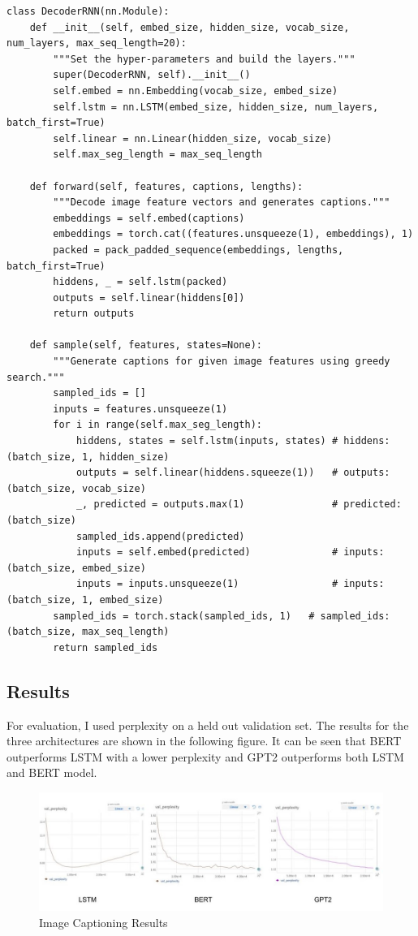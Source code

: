 \documentclass[]{krantz}
\begin{document}
\begin{verbatim}
class DecoderRNN(nn.Module):
    def __init__(self, embed_size, hidden_size, vocab_size, num_layers, max_seq_length=20):
        """Set the hyper-parameters and build the layers."""
        super(DecoderRNN, self).__init__()
        self.embed = nn.Embedding(vocab_size, embed_size)
        self.lstm = nn.LSTM(embed_size, hidden_size, num_layers, batch_first=True)
        self.linear = nn.Linear(hidden_size, vocab_size)
        self.max_seg_length = max_seq_length
        
    def forward(self, features, captions, lengths):
        """Decode image feature vectors and generates captions."""
        embeddings = self.embed(captions)
        embeddings = torch.cat((features.unsqueeze(1), embeddings), 1)
        packed = pack_padded_sequence(embeddings, lengths, batch_first=True) 
        hiddens, _ = self.lstm(packed)
        outputs = self.linear(hiddens[0])
        return outputs
    
    def sample(self, features, states=None):
        """Generate captions for given image features using greedy search."""
        sampled_ids = []
        inputs = features.unsqueeze(1)
        for i in range(self.max_seg_length):
            hiddens, states = self.lstm(inputs, states) # hiddens: (batch_size, 1, hidden_size)
            outputs = self.linear(hiddens.squeeze(1))   # outputs:  (batch_size, vocab_size)
            _, predicted = outputs.max(1)               # predicted: (batch_size)
            sampled_ids.append(predicted)
            inputs = self.embed(predicted)              # inputs: (batch_size, embed_size)
            inputs = inputs.unsqueeze(1)                # inputs: (batch_size, 1, embed_size)
        sampled_ids = torch.stack(sampled_ids, 1)   # sampled_ids: (batch_size, max_seq_length)
        return sampled_ids
\end{verbatim}

\hypertarget{results}{%
\subsection{Results}\label{results}}

For evaluation, I used perplexity on a held out validation set. The results for the three architectures are shown in the following figure. It can be seen that BERT outperforms LSTM with a lower perplexity and GPT2 outperforms both LSTM and BERT model.

\begin{figure}
\centering
\includegraphics{figures/04-01-use-case1/caption_results.jpg}
\caption{Image Captioning Results}
\end{figure}
\end{document}
